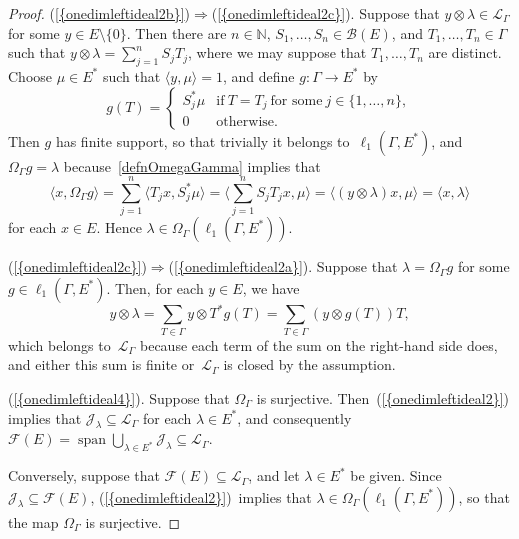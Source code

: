 \documentclass[12pt]{amsart}
\theoremstyle{definition}
\numberwithin{equation}{section}
\begin{document}
\begin{proof}
  {{\normalfont\textrm{(\ref{{onedimleftideal2b}})}}}$\Rightarrow${{\normalfont\textrm{(\ref{{onedimleftideal2c}})}}}.
  Suppose that $y\otimes\lambda\in\mathscr{L}_{\Gamma}$ for some $y\in
  E\setminus\{0\}$. Then there are $n\in{\ensuremath{\mathbb{N}}}$,
  $S_1,\ldots,S_n\in\mathscr{B}(E)$, and $T_1,\ldots,T_n\in\Gamma$
  such that $y\otimes\lambda = \sum_{j=1}^n S_jT_j$, where we may
  suppose that $T_1,\ldots,T_n$ are distinct. Choose $\mu\in E^*$ such
  that $\langle y,\mu\rangle =1$, and define $g\colon\Gamma\to E^*$ by
  \[ g(T) = \begin{cases} S^*_j\mu &\text{if}\ T=T_j\ \text{for some}\
    j\in\{1,\ldots,n\},\\ 0 &\text{otherwise.} \end{cases} \] Then $g$
  has finite support, so that trivially it belongs
  to~$\ell_1(\Gamma,E^*)$, and $\Omega_\Gamma g = \lambda$
  because~\eqref{defnOmegaGamma} implies that
  \[ \langle x,\Omega_\Gamma g\rangle = \sum_{j=1}^n\langle T_jx,
  S_j^*\mu\rangle = \biggl\langle \sum_{j=1}^n S_jT_j
  x,\mu\biggr\rangle = \bigl\langle (y\otimes\lambda)x,\mu\bigr\rangle
  = \langle x,\lambda\rangle \] for each $x\in E$. Hence
  $\lambda\in\Omega_{\Gamma}(\ell_1(\Gamma,E^*))$.

  {{\normalfont\textrm{(\ref{{onedimleftideal2c}})}}}$\Rightarrow${{\normalfont\textrm{(\ref{{onedimleftideal2a}})}}}.
  Suppose that $\lambda = \Omega_{\Gamma}g$ for some
  $g\in\ell_1(\Gamma,E^*)$. Then, for each $y\in E$, we have
  \[ y\otimes \lambda = \sum_{T\in\Gamma}y\otimes T^*g(T) =
  \sum_{T\in\Gamma}(y\otimes g(T))T, \] which belongs
  to~$\mathscr{L}_\Gamma$ because each term of the sum on the
  right-hand side does, and either this sum is finite
  or~$\mathscr{L}_\Gamma$ is closed by the assumption.

  {{\normalfont\textrm{(\ref{{onedimleftideal4}})}}}.  Suppose that $\Omega_{\Gamma}$ is
  surjective. Then~{{\normalfont\textrm{(\ref{{onedimleftideal2}})}}} implies that
  $\mathscr{J}_\lambda\subseteq\mathscr{L}_{\Gamma}$ for each
  $\lambda\in E^*$, and consequently $\mathscr{F}(E) =
  \operatorname{span}\bigcup_{\lambda\in
    E^*}\mathscr{J}_\lambda\subseteq\mathscr{L}_{\Gamma}$.
  
  Conversely, suppose that
  $\mathscr{F}(E)\subseteq\mathscr{L}_{\Gamma}$, and let $\lambda\in
  E^*$ be given. Since
  \mbox{$\mathscr{J}_\lambda\subseteq\mathscr{F}(E)$},
  {{\normalfont\textrm{(\ref{{onedimleftideal2}})}}}~implies that
  $\lambda\in\Omega_{\Gamma}(\ell_1(\Gamma,E^*))$, so that the map
  $\Omega_{\Gamma}$ is surjective.
\end{proof}
\end{document}
